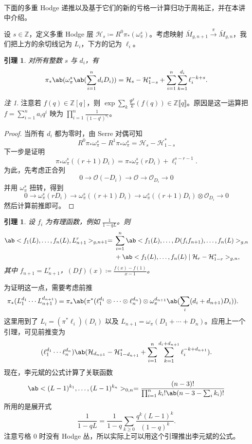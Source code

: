 \documentclass{amsart}
\newtheorem{lem}[thm]{引理}
\theoremstyle{definition}
\theoremstyle{remark}
\newtheorem{rmk}[thm]{注}
\theoremstyle{plain}
\theoremstyle{definition}
\theoremstyle{remark}
\newcommand{\Z}{\mathbb{Z}}
\newcommand{\mc}[1]{\mathcal{#1}}
\newcommand{\1}{\mathbf{1}}
\newcommand{\2}{\mathbf{2}}
\newcommand{\3}{\mathbf{3}}
\newcommand{\ps}[1]{\llbracket #1 \rrbracket}
\begin{document}
下面的多重 Hodge 递推以及基于它们的新的亏格一计算归功于周祐正，并在本讲中介绍。

设 \(s \in \Z\)，定义多重 Hodge 层 \(\mc{H}_s \coloneqq R^0 \pi_* (\omega_{\pi}^s)\)。考虑映射 \(\bar{M}_{g,n+1} \xrightarrow{\pi} \bar{M}_{g,n}\)，我们把上方的余切线记为 \(L_i\)，下方的记为 \(\ell_i\)。

\begin{lem}
    对所有整数 \(s\) 与 \(d_i\)，有
    \[ \pi_*\ab(\omega_{\pi}^s\ab(\sum_{i=1}^n d_i D_i)) = \mc{H}_s-\mc{H}_{1-s}^* + \sum_{i=1}^n \sum_{k=1}^{d_i} \ell_i^{-k+s}. \]
\end{lem}

\begin{rmk}
    注意若 \(f(q) \in \Z[q]\)，则 \(\exp \sum_k \frac{\Psi^k}{k} (f(q)) \in \Z \ps{q}\)。原因是这一运算把 \(f = \sum_{i=1}^{n} a_i q^i\) 映为 \(\prod_{i=1}^n \frac{1}{(1-q^i)^{a_i}}\)。
\end{rmk}

\begin{proof}
    当所有 \(d_i\) 都为零时，由 Serre 对偶可知
    \[ R^0 \pi_* \omega_{\pi}^s - R^1 \pi_* \omega_{\pi}^s = \mc{H}_s - \mc{H}_{1-s}^* \]
    下一步是证明
    \[ \pi_* \omega_{\pi}^s ((r+1)D_i) = \pi_* \omega_{\pi}^s(r D_i) + \ell_i^{s-r-1}. \]
    为此，先考虑正合列
    \[ 0 \to \mc{O} (-D_i) \to \mc{O} \to \mc{O}_{D_i} \to 0 \]
    并用 \(\omega_{\pi}^s\) 扭转，得到
    \[ 0 \to \omega_{\pi}^s(r D_i) \to \omega_{\pi}^s ((r+1)D_i) \to \omega_{\pi}^s ((r+1)D_i) \otimes \mc{O}_{D_i} \to 0 \]
    然后计算前推即可。
\end{proof}

\begin{lem}
    设 \(f_i\) 为有理函数，例如 \(\frac{1}{1-q L}\)。则
    \begin{align*}
        \ab<f_1(L), \ldots, f_n(L), L_{n+1}^r>_{g, n+1} ={}& \sum_{i=1}^n \ab<f_1(L), \ldots, D(f_i f_{n+1}), \ldots, f_n(L)>_{g, n} \\
        &+ \ab<f_1(L), \ldots, f_n(L) \mid \mc{H}_r - \mc{H}_{1-r}^*>_{g,n},
    \end{align*}
    其中 \(f_{n+1} = L_{n+1}^r\)，\((Df)(x) \coloneqq \frac{f(x)-f(1)}{x-1}\)。
\end{lem}

为证明这一点，需要考虑前推
\begin{align*}
    \pi_* (L_1^{d_1} \cdots L_{n+1}^{d_{n+1}}) &= \pi_* \ab(\pi^*(\ell_1^{d_1} \otimes \cdots \otimes \ell_n^{d_n}) \otimes \omega_{\pi}^{d_{n+1}}\ab(\sum_i (d_i+d_{n+1})D_i)).
\end{align*}
这里用到了 \(L_i = (\pi^* \ell_i)(D_i)\) 以及 \(L_{n+1} = \omega_{\pi}(D_1 + \cdots + D_n)\)。应用上一个引理，可见前推变为
\[ (\ell_1^{d_1} \cdots \ell_n^{d_n})\ab(\mc{H}_{d_{n+1}} - \mc{H}_{1-d_{n+1}}^* + \sum_{i=1}^n \sum_{k=1}^{d_i + d_{n+1}} \ell_i^{-k+d_{n+1}}). \]
现在，李元斌的公式计算了关联函数
\[ \ab<(L-1)^{k_1}, \ldots, (L-1)^{k_n}>_{0,n} = \frac{(n-3)!}{\prod_{i=1}^n k_i! \ab(n-3-\sum_i k_i)!} \]
所用的是展开式
\[ \frac{1}{1-qL} = \frac{1}{1-q} \sum_{k \geq 0} \frac{q^k(L-1)^k}{(1-q)^k}. \]
注意亏格 \(0\) 时没有 Hodge 丛，所以实际上可以用这个引理推出李元斌的公式。
\end{document}
